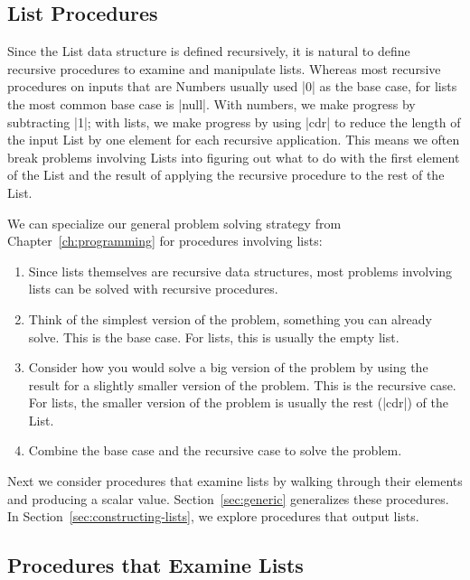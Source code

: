 \begin{schemeregion}

\section{List Procedures}\label{sec:listprocedures}

Since the List data structure is defined recursively, it is natural to define recursive procedures to examine and manipulate lists.  Whereas most recursive procedures on inputs that are Numbers usually used \scheme|0| as the base case, for lists the most common base case is \scheme|null|.  With numbers, we make progress by subtracting \scheme|1|; with lists, we make progress by using \scheme|cdr| to reduce the length of the input List by one element for each recursive application.  This means we often break problems involving Lists into figuring out what to do with the first element of the List and the result of applying the recursive procedure to the rest of the List.  

We can specialize our general problem solving strategy from Chapter~\ref{ch:programming} for procedures involving lists:
\begin{enumerate}
\item {}  Since lists themselves are recursive data structures, most problems involving lists can be solved with recursive procedures.
\item Think of the simplest version of the problem, something you can already solve.  This is the base case.  For lists, this is usually the empty list.
\item Consider how you would solve a big version of the problem by using the result for a slightly smaller version of the problem.  This is the recursive case.  For lists, the smaller version of the problem is usually the rest (\scheme|cdr|) of the List.
\item Combine the base case and the recursive case to solve the problem.
\end{enumerate}

Next we consider procedures that examine lists by walking through their elements and producing a scalar value.  Section~\ref{sec:generic} generalizes these procedures.  In Section~\ref{sec:constructing-lists}, we explore procedures that output lists.

\subsection{Procedures that Examine Lists}\label{sec:examining-lists}


\end{schemeregion}
